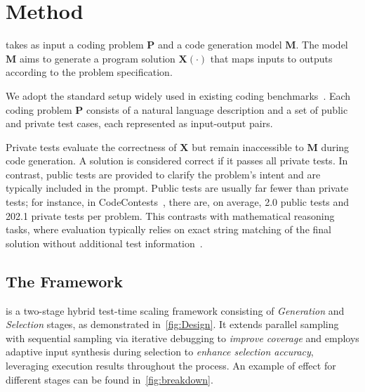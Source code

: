 
\section{Method}
\label{sec:method}

\frameworkname takes as input a coding problem $\mathbf{P}$ and a code generation model $\mathbf{M}$. The model $\mathbf{M}$ aims to generate a program solution $\mathbf{X(\cdot)}$ that maps inputs to outputs according to the problem specification.

We adopt the standard setup widely used in existing coding benchmarks~\citep{chen2021evaluating, li2022competition, li2023taco, jain2024livecodebench, hendrycksapps2021, gulwani4foundations}. Each coding problem $\mathbf{P}$ consists of a natural language description and a set of public and private test cases, each represented as input-output pairs. 

Private tests evaluate the correctness of $\mathbf{X}$ but remain inaccessible to $\mathbf{M}$ during code generation. A solution is considered correct if it passes all private tests. In contrast, public tests are provided to clarify the problem's intent and are typically included in the prompt. Public tests are usually far fewer than private tests; for instance, in CodeContests~\citep{li2022competition}, there are, on average, 2.0 public tests and 202.1 private tests per problem. This contrasts with mathematical reasoning tasks, where evaluation typically relies on exact string matching of the final solution without additional test information~\citep{li2024numinamath}.

\subsection{The \frameworkname Framework}
\frameworkname is a two-stage hybrid test-time scaling framework consisting of \emph{Generation} and \emph{Selection} stages, as demonstrated in~\cref{fig:Design}. It extends parallel sampling with sequential sampling via iterative debugging to \emph{improve coverage} and employs adaptive input synthesis during selection to \emph{enhance selection accuracy}, leveraging execution results throughout the process. An example of effect for different stages can be found in~\cref{fig:breakdown}.

